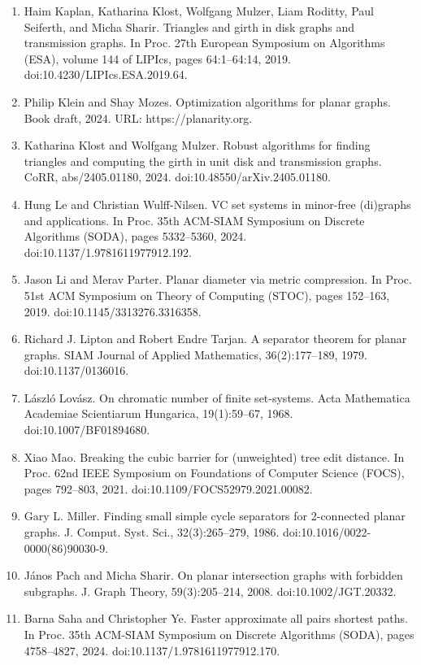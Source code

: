 \begin{enumerate}
\item[]  [33]  Haim Kaplan, Katharina Klost, Wolfgang Mulzer, Liam Roditty, Paul Seiferth, and Micha Sharir.  Triangles and girth in disk graphs and transmission graphs.  In Proc. 27th European Symposium on Algorithms (ESA), volume 144 of LIPIcs, pages 64:1–64:14, 2019.  doi:10.4230/LIPIcs.ESA.2019.64.  
\item[]  [34]  Philip Klein and Shay Mozes.  Optimization algorithms for planar graphs.  Book draft, 2024.  URL: https://planarity.org.  
\item[]  [35]  Katharina Klost and Wolfgang Mulzer.  Robust algorithms for finding triangles and computing the girth in unit disk and transmission graphs.  CoRR, abs/2405.01180, 2024.  doi:10.48550/arXiv.2405.01180.  
\item[]  [36]  Hung Le and Christian Wulff-Nilsen.  VC set systems in minor-free (di)graphs and applications.  In Proc. 35th ACM-SIAM Symposium on Discrete Algorithms (SODA), pages 5332–5360, 2024.  doi:10.1137/1.9781611977912.192.  
\item[]  [37]  Jason Li and Merav Parter.  Planar diameter via metric compression.  In Proc. 51st ACM Symposium on Theory of Computing (STOC), pages 152–163, 2019.  doi:10.1145/3313276.3316358.  
\item[]  [38]  Richard J. Lipton and Robert Endre Tarjan.  A separator theorem for planar graphs.  SIAM Journal of Applied Mathematics, 36(2):177–189, 1979.  doi:10.1137/0136016.  
\item[]  [39]  László Lovász.  On chromatic number of finite set-systems.  Acta Mathematica Academiae Scientiarum Hungarica, 19(1):59–67, 1968.  doi:10.1007/BF01894680.  
\item[]  [40]  Xiao Mao.  Breaking the cubic barrier for (unweighted) tree edit distance.  In Proc. 62nd IEEE Symposium on Foundations of Computer Science (FOCS), pages 792–803, 2021.  doi:10.1109/FOCS52979.2021.00082.  
\item[]  [41]  Gary L. Miller.  Finding small simple cycle separators for 2-connected planar graphs.  J. Comput. Syst. Sci., 32(3):265–279, 1986.  doi:10.1016/0022-0000(86)90030-9.  
\item[]  [42]  János Pach and Micha Sharir.  On planar intersection graphs with forbidden subgraphs.  J. Graph Theory, 59(3):205–214, 2008.  doi:10.1002/JGT.20332.  
\item[]  [43]  Barna Saha and Christopher Ye.  Faster approximate all pairs shortest paths.  In Proc. 35th ACM-SIAM Symposium on Discrete Algorithms (SODA), pages 4758–4827, 2024.  doi:10.1137/1.9781611977912.170.  

\end{enumerate}
